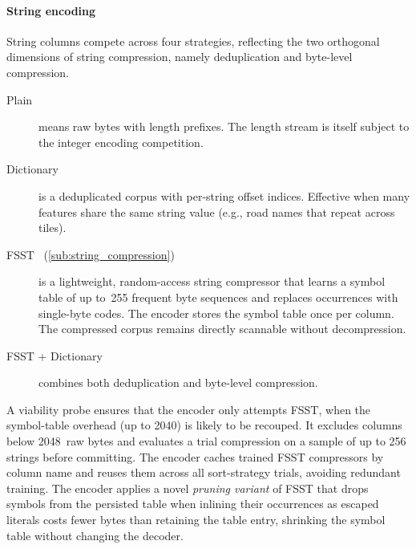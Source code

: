 \paragraph{String encoding}
String columns compete across four strategies, reflecting the two orthogonal dimensions of string compression, namely deduplication and byte-level compression.

\begin{description}
    \item[Plain] means raw bytes with length prefixes.
    The length stream is itself subject to the integer encoding competition.
    \item[Dictionary] is a deduplicated corpus with per-string offset indices.
    Effective when many features share the same string value (e.g., road names that repeat across tiles).
    \item[\ac{FSST}~\cite{bonczFSSTFastRandom2020} (\cref{sub:string_compression})] is a lightweight, random-access string compressor that learns a symbol table of up to~255 frequent byte sequences and replaces occurrences with single-byte codes.
    The encoder stores the symbol table once per column.
    The compressed corpus remains directly scannable without decompression.
    \item[\ac{FSST} + Dictionary] combines both deduplication and byte-level compression.
\end{description}

A viability probe ensures that the encoder only attempts \ac{FSST}, when the symbol-table overhead (up to \qty{2040}{\byte}) is likely to be recouped.
It excludes columns below \num{2048}~raw bytes and evaluates a trial compression on a sample of up to \num{256} strings before committing.
The encoder caches trained \ac{FSST} compressors by column name and reuses them across all sort-strategy trials, avoiding redundant training.
The encoder applies a novel \emph{pruning variant} of \ac{FSST} that drops symbols from the persisted table when inlining their occurrences as escaped literals costs fewer bytes than retaining the table entry, shrinking the symbol table without changing the decoder.

\DeclareRobustCommand{\circled}[1]{\tikz[baseline=(char.base)]{\node[circle, draw, inner sep=1pt, font=\scriptsize\bfseries] (char) {#1};}}

